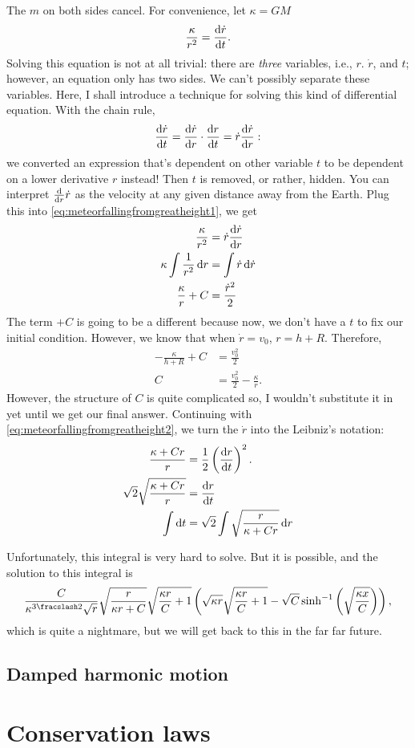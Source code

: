 The $m$ on both sides cancel. For convenience, let $\kappa = GM$
\begin{equation}
    \frac{\kappa}{r^2} = \odv{\dot{r}}{t}. \label{eq:meteorfallingfromgreatheight1}
\end{equation}
Solving this equation is not at all trivial: there are \emph{three} variables, i.e., $r$. $\dot{r}$, and $t$; however, an equation only has two sides. We can't possibly separate these variables. Here, I shall introduce a technique for solving this kind of differential equation. With the chain rule,
\begin{equation*}
    \odv{\dot{r}}{t} = \odv{\dot{r}}{r} \cdot \odv{r}{t} = \dot{r}\odv{\dot{r}}{r}:
\end{equation*}
we converted an expression that's dependent on other variable $t$ to be dependent on a lower derivative $r$ instead! Then $t$ is removed, or rather, hidden. You can interpret $\odv*{\dot{r}}{r}$ as the velocity at any given distance away from the Earth. Plug this into \cref{eq:meteorfallingfromgreatheight1}, we get
\begin{align}
    \frac{\kappa}{r^2} &= \dot{r}\odv{\dot{r}}{r} \nonumber\\
    \kappa\int\frac{1}{r^2}\odif{r} &= \int\dot{r}\odif{\dot{r}} \nonumber\\
    \frac{\kappa}{r} + C &= \frac{\dot{r}^2}{2} \label{eq:meteorfallingfromgreatheight2}
\end{align}
The term $+C$ is going to be a different because now, we don't have a $t$ to fix our initial condition. However, we know that when $\dot{r} = v_0$, $r = h + R$. Therefore,
\begin{align*}
    -\frac{\kappa}{h + R} + C &= \frac{v_0^2}{2} \\
    C &= \frac{v_0^2}{2} - \frac{\kappa}{r}.
\end{align*}
However, the structure of $C$ is quite complicated so, I wouldn't substitute it in yet until we get our final answer. Continuing with \cref{eq:meteorfallingfromgreatheight2}, we turn the $\dot{r}$ into the Leibniz's notation:
\begin{align*}
    \frac{\kappa + Cr}{r} &= \frac{1}{2}\left(\odv{r}{t}\right)^2. \\
    \sqrt{2}\sqrt{\frac{\kappa + Cr}{r}} &= \odv{r}{t} \\
    \int\odif{t} &= \sqrt{2}\int\sqrt{\frac{r}{\kappa + Cr}}\odif{r}
\end{align*}

Unfortunately, this integral is very hard to solve. But it is possible, and the solution to this integral is
\begin{equation*}
    \frac{C}{\kappa^{\flatfrac{3}{2}}\sqrt{r}}\sqrt{\frac{r}{\kappa r + C}}\sqrt{\frac{\kappa r}{C} + 1} \left(\sqrt{\kappa r}\sqrt{\frac{\kappa r}{C} + 1} - \sqrt{C}\sinh^{-1}\left(\sqrt{\frac{\kappa x}{C}}\right)\right),
\end{equation*}
which is quite a nightmare, but we will get back to this in the far far future.

\subsection{Damped harmonic motion}

\section{Conservation laws}
